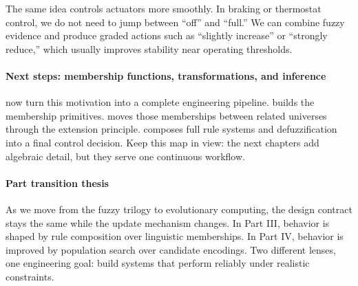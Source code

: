 The same idea controls actuators more smoothly. In braking or thermostat control, we do not need to jump between ``off'' and ``full.'' We can combine fuzzy evidence and produce graded actions such as ``slightly increase'' or ``strongly reduce,'' which usually improves stability near operating thresholds.

\paragraph{Next steps: membership functions, transformations, and inference}
 now turn this motivation into a complete engineering pipeline.  builds the membership primitives.  moves those memberships between related universes through the extension principle.  composes full rule systems and defuzzification into a final control decision. Keep this map in view: the next chapters add algebraic detail, but they serve one continuous workflow.

\paragraph{Part transition thesis}
As we move from the fuzzy trilogy to evolutionary computing, the design contract stays the same while the update mechanism changes. In Part III, behavior is shaped by rule composition over linguistic memberships. In Part IV, behavior is improved by population search over candidate encodings. Two different lenses, one engineering goal: build systems that perform reliably under realistic constraints.

